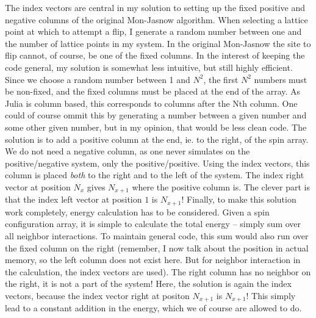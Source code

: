 \documentclass[12pt, a4paper]{article}
\begin{document}
The index vectors are central in my solution to setting up the fixed positive and negative columns of the original Mon-Jasnow algorithm.
When selecting a lattice point at which to attempt a flip, I generate a random number between one and the number of lattice points in my system.
In the original Mon-Jasnow the site to flip cannot, of course, be one of the fixed columns.
In the interest of keeping the code general, my solution is somewhat less intuitive, but still highly efficient.
Since we choose a random number between 1 and $N^2$, the first $N^2$ numbers must be non-fixed, and the fixed columns must be placed at the end of the array.
As Julia is column based, this corresponds to columns after the Nth column.
One could of course ommit this by generating a number between a given number and some other given number, but in my opinion, that would be less clean code.
The solution is to add a positive column at the end, ie. to the right, of the spin array.
We do not need a negative column, as one never simulates on the positive/negative system, only the positive/positive.
Using the index vectors, this column is placed \emph{both} to the right and to the left of the system.
The index right vector at position $N_x$ gives $N_{x+1}$ where the positive column is.
The clever part is that the index left vector at position $1$ is $N_{x+1}$!
Finally, to make this solution work completely, energy calculation has to be considered.
Given a spin configuration array, it is simple to calculate the total energy -- simply sum over all neighbor interactions.
To maintain general code, this sum would also run over the fixed column on the right (remember, I now talk about the position in actual memory, so the left column does not exist here. But for neighbor interaction in the calculation, the index vectors are used).
The right column has no neighbor on the right, it is not a part of the system!
Here, the solution is again the index vectors, because the index vector right at positon $N_{x+1}$ is $N_{x+1}$!
This simply lead to a constant addition in the energy, which we of course are allowed to do.
\end{document}

